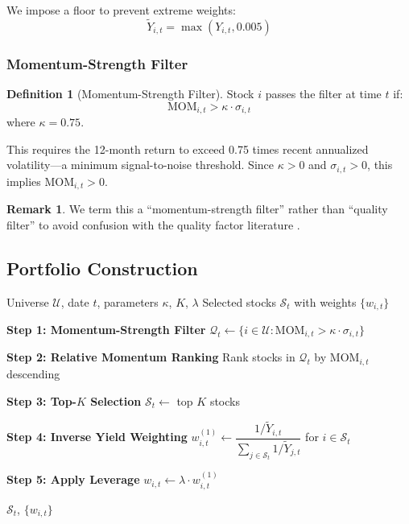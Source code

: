 \documentclass[12pt,a4paper]{article}
\theoremstyle{definition}
\newtheorem{definition}{Definition}
\newtheorem{remark}{Remark}
\begin{document}
We impose a floor to prevent extreme weights:
\begin{equation}
\tilde{Y}_{i,t} = \max(Y_{i,t}, 0.005)
\label{eq:yield_floor}
\end{equation}

\subsubsection{Momentum-Strength Filter}

\begin{definition}[Momentum-Strength Filter]
Stock $i$ passes the filter at time $t$ if:
\begin{equation}
\text{MOM}_{i,t} > \kappa \cdot \sigma_{i,t}
\label{eq:strength_filter}
\end{equation}
where $\kappa = 0.75$.
\end{definition}

This requires the 12-month return to exceed 0.75 times recent annualized volatility---a minimum signal-to-noise threshold. Since $\kappa > 0$ and $\sigma_{i,t} > 0$, this implies $\text{MOM}_{i,t} > 0$.

\begin{remark}
We term this a ``momentum-strength filter'' rather than ``quality filter'' to avoid confusion with the quality factor literature \citep{asness2019quality}.
\end{remark}

\subsection{Portfolio Construction}

\begin{algorithm}[H]
\caption{Cross-Sectional Momentum with Inverse Yield Weighting}
\label{alg:selection}
\begin{algorithmic}[1]
\Require Universe $\mathcal{U}$, date $t$, parameters $\kappa$, $K$, $\lambda$
\Ensure Selected stocks $\mathcal{S}_t$ with weights $\{w_{i,t}\}$

\State \textbf{Step 1: Momentum-Strength Filter}
\State $\mathcal{Q}_t \gets \{i \in \mathcal{U} : \text{MOM}_{i,t} > \kappa \cdot \sigma_{i,t}\}$

\State \textbf{Step 2: Relative Momentum Ranking}
\State Rank stocks in $\mathcal{Q}_t$ by $\text{MOM}_{i,t}$ descending

\State \textbf{Step 3: Top-$K$ Selection}
\State $\mathcal{S}_t \gets$ top $K$ stocks

\State \textbf{Step 4: Inverse Yield Weighting}
\State $w^{(1)}_{i,t} \gets \dfrac{1/\tilde{Y}_{i,t}}{\sum_{j \in \mathcal{S}_t} 1/\tilde{Y}_{j,t}}$ for $i \in \mathcal{S}_t$ 

\State \textbf{Step 5: Apply Leverage}
\State $w_{i,t} \gets \lambda \cdot w^{(1)}_{i,t}$ 

\State \Return $\mathcal{S}_t$, $\{w_{i,t}\}$
\end{algorithmic}
\end{algorithm}
\end{document}
